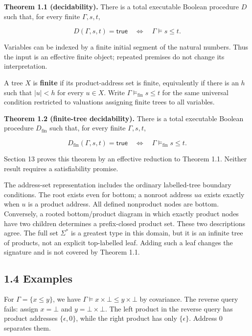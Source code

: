 \documentclass[
  11pt,
  a4paper,
]{article}
\begin{document}

\textbf{Theorem 1.1 (decidability).} There is a total executable Boolean
procedure \(D\) such that, for every finite \(\Gamma,s,t\),

\[D(\Gamma,s,t)=\mathsf{true}\quad\Longleftrightarrow\quad\Gamma\models s\le t.\]

Variables can be indexed by a finite initial segment of the natural
numbers. Thus the input is an effective finite object; repeated premises
do not change its interpretation.

A tree \(X\) is \textbf{finite} if its product-address set is finite,
equivalently if there is an \(h\) such that \(|u|<h\) for every
\(u\in X\). Write \(\Gamma\models_{\mathrm{fin}}s\le t\) for the same
universal condition restricted to valuations assigning finite trees to
all variables.


\textbf{Theorem 1.2 (finite-tree decidability).} There is a total
executable Boolean procedure \(D_{\mathrm{fin}}\) such that, for every
finite \(\Gamma,s,t\),

\[D_{\mathrm{fin}}(\Gamma,s,t)=\mathsf{true}
\quad\Longleftrightarrow\quad\Gamma\models_{\mathrm{fin}}s\le t.\]

Section 13 proves this theorem by an effective reduction to Theorem 1.1.
Neither result requires a satisfiability promise.

The address-set representation includes the ordinary labelled-tree
boundary conditions. The root exists even for bottom; a nonroot address
\(ua\) exists exactly when \(u\) is a product address. All defined
nonproduct nodes are bottom. Conversely, a rooted bottom/product diagram
in which exactly product nodes have two children determines a
prefix-closed product set. These two descriptions agree. The full set
\(\Sigma^*\) is a greatest type in this domain, but it is an infinite
tree of products, not an explicit top-labelled leaf. Adding such a leaf
changes the signature and is not covered by Theorem 1.1.

\subsection{1.4 Examples}\label{examples}

For \(\Gamma=\{x\le y\}\), we have
\(\Gamma\models x\times\bot\le y\times\bot\) by covariance. The reverse
query fails: assign \(x=\bot\) and \(y=\bot\times\bot\). The left
product in the reverse query has product addresses \(\{\epsilon,0\}\),
while the right product has only \(\{\epsilon\}\). Address \(0\)
separates them.
\end{document}
